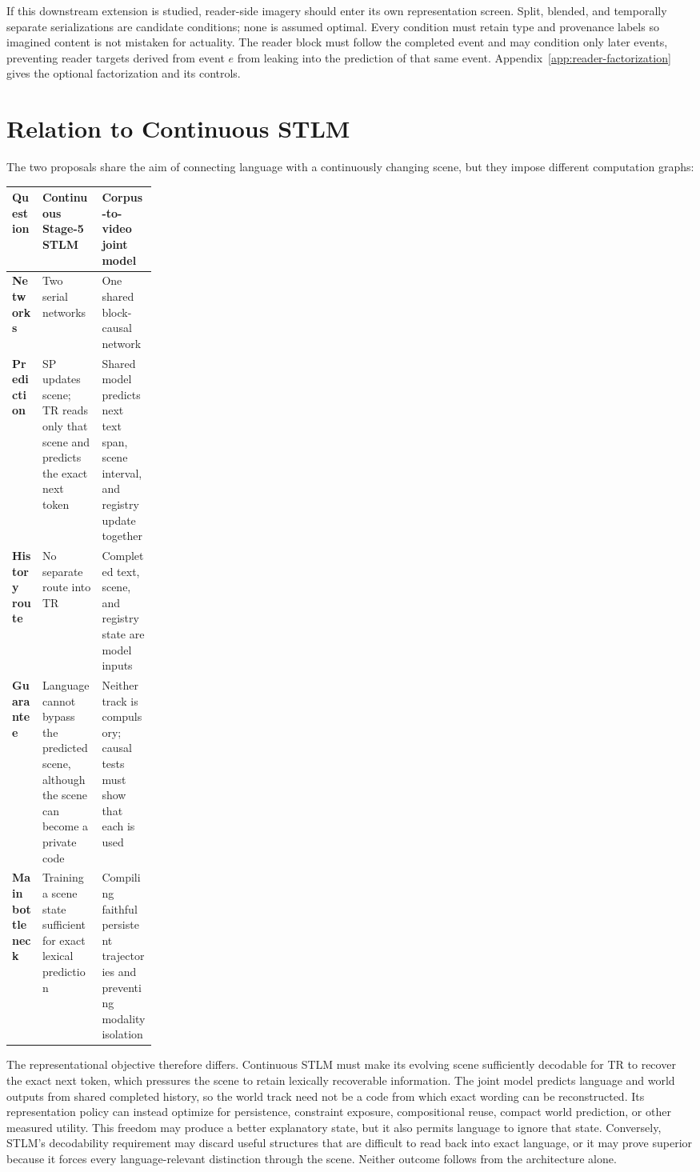 \documentclass[11pt]{article}
\begin{document}
If this downstream extension is studied, reader-side imagery should enter its own representation screen. Split, blended, and temporally separate serializations are candidate conditions; none is assumed optimal. Every condition must retain type and provenance labels so imagined content is not mistaken for actuality. The reader block must follow the completed event and may condition only later events, preventing reader targets derived from event $e$ from leaking into the prediction of that same event. Appendix~\ref{app:reader-factorization} gives the optional factorization and its controls.

\section{Relation to Continuous STLM}
\label{sec:stlm}

The two proposals share the aim of connecting language with a continuously changing scene, but they impose different computation graphs:

\begin{center}
\begin{tabularx}{0.97\linewidth}{@{}>{\bfseries}p{0.21\linewidth}X X@{}}
\toprule
Question & Continuous Stage-5 STLM & Corpus-to-video joint model \\
\midrule
Networks & Two serial networks & One shared block-causal network \\
Prediction & SP updates scene; TR reads only that scene and predicts the exact next token & Shared model predicts next text span, scene interval, and registry update together \\
History route & No separate route into TR & Completed text, scene, and registry state are model inputs \\
Guarantee & Language cannot bypass the predicted scene, although the scene can become a private code & Neither track is compulsory; causal tests must show that each is used \\
Main bottleneck & Training a scene state sufficient for exact lexical prediction & Compiling faithful persistent trajectories and preventing modality isolation \\
\bottomrule
\end{tabularx}
\end{center}

The representational objective therefore differs. Continuous STLM must make its evolving scene sufficiently decodable for TR to recover the exact next token, which pressures the scene to retain lexically recoverable information. The joint model predicts language and world outputs from shared completed history, so the world track need not be a code from which exact wording can be reconstructed. Its representation policy can instead optimize for persistence, constraint exposure, compositional reuse, compact world prediction, or other measured utility. This freedom may produce a better explanatory state, but it also permits language to ignore that state. Conversely, STLM's decodability requirement may discard useful structures that are difficult to read back into exact language, or it may prove superior because it forces every language-relevant distinction through the scene. Neither outcome follows from the architecture alone.
\end{document}
